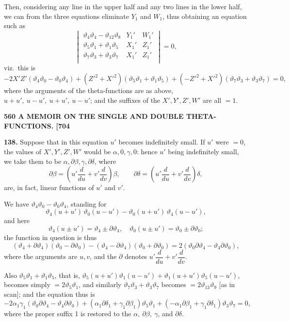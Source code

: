 \documentclass[11pt]{article}
\begin{document}
Then, considering any line in the upper half and any two lines in the lower half, we can from the three equations eliminate $Y_1$ and $W_1$, thus obtaining an equation such as
\[
\begin{vmatrix} \vartheta_4\vartheta_4 - \vartheta_{12}\vartheta_8 & Y_1' & W_1'\\ \vartheta_5\vartheta_1 + \vartheta_1\vartheta_5 & X_1' & Z_1'\\ \vartheta_7\vartheta_3 + \vartheta_3\vartheta_7 & X_1' & Z_1'\\ \end{vmatrix} = 0,
\]
viz.\ this is
\[
-2X'Z'(\vartheta_4\vartheta_0 - \vartheta_0\vartheta_4) + (Z'^2 + X'^2)(\vartheta_5\vartheta_1 + \vartheta_1\vartheta_5) + (-Z'^2 + X'^2)(\vartheta_7\vartheta_3 + \vartheta_3\vartheta_7) = 0,
\]
where the arguments of the theta-functions are as above, $u + u',\ u - u',\ u + u',\ u - u'$; and the suffixes of the $X', Y', Z', W'$ are all $= 1$.

\newpage
\noindent\textbf{560 \hfill A MEMOIR ON THE SINGLE AND DOUBLE THETA-FUNCTIONS. \hfill [704}

\medskip
\textbf{138.} Suppose that in this equation $u'$ becomes indefinitely small. If $u'$ were $=0$, the values of $X', Y', Z', W'$ would be $\alpha, 0, \gamma, 0$: hence $u'$ being indefinitely small, we take them to be $\alpha, \partial\beta, \gamma, \partial\delta$, where
\[
\partial\beta = \left(u'\frac{d}{du} + v'\frac{d}{dv}\right)\beta,\qquad \partial\delta = \left(u'\frac{d}{du} + v'\frac{d}{dv}\right)\delta,
\]
are, in fact, linear functions of $u'$ and $v'$.

\medskip
We have $\vartheta_4\vartheta_0 - \vartheta_0\vartheta_4$, standing for
\[
\vartheta_4(u + u')\,\vartheta_0(u - u') - \vartheta_0(u + u')\,\vartheta_4(u - u'),
\]
and here
\[
\vartheta_4(u \pm u') = \vartheta_4 \pm \partial\vartheta_4,\quad \vartheta_0(u \pm u') = \vartheta_0 \pm \partial\vartheta_0;
\]
the function in question is thus
\[
(\vartheta_4 + \partial\vartheta_4)(\vartheta_0 - \partial\vartheta_0) - (\vartheta_4 - \partial\vartheta_4)(\vartheta_0 + \partial\vartheta_0) = 2(\vartheta_0\partial\vartheta_4 - \vartheta_4\partial\vartheta_0),
\]
where the arguments are $u, v$, and the $\partial$ denotes $u'\dfrac{d}{du} + v'\dfrac{d}{dv}$.

\medskip
Also $\vartheta_5\vartheta_1 + \vartheta_1\vartheta_5$, that is, $\vartheta_5(u + u')\vartheta_1(u - u') + \vartheta_1(u + u')\vartheta_5(u - u')$, becomes simply $= 2\vartheta_5\vartheta_1$, and similarly $\vartheta_7\vartheta_3 + \vartheta_3\vartheta_7$ becomes $= 2\vartheta_{13}\vartheta_9$ [as in scan]; and the equation thus is
\[
-2\alpha_1\gamma_1(\vartheta_0\partial\vartheta_4 - \vartheta_4\partial\vartheta_0) + (\alpha_1\partial\delta_1 + \gamma_1\partial\beta_1)\vartheta_5\vartheta_1 + (-\alpha_1\partial\beta_1 + \gamma_1\partial\delta_1)\vartheta_3\vartheta_7 = 0,
\]
where the proper suffix 1 is restored to the $\alpha,\ \partial\beta,\ \gamma$, and $\partial\delta$.
\end{document}
